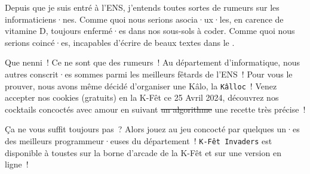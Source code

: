 
Depuis que je suis entré à l'ENS, j'entends toutes sortes de rumeurs sur les informaticiens·nes. 
Comme quoi nous serions asocia·ux·les, en carence de vitamine D, toujours enfermé·es dans nos sous-sols à coder. 
Comme quoi nous serions coincé·es, incapables d'écrire de beaux textes dans le \BOcal{}.

Que nenni~! Ce ne sont que des rumeurs~!
Au département d'informatique, nous autres conscrit·es sommes parmi les meilleurs fêtards de l'ENS~!
Pour vous le prouver, nous avons même décidé d'organiser une Kâlo, la \texttt{Kâlloc}~!
Venez accepter nos cookies (gratuits) en la K-Fêt ce 25 Avril 2024, découvrez nos cocktails concoctés avec amour en suivant \sout{un algorithme} une recette très précise~!

Ça ne vous suffit toujours pas~? 
Alors jouez au jeu concocté par quelques un·es des meilleurs programmeur·euses du département~!
\texttt{K-Fêt Invaders} est disponible à toustes sur la borne d'arcade de la K-Fêt et sur une version en ligne~!

\signature{Matthieu pour la Kâlloc}
